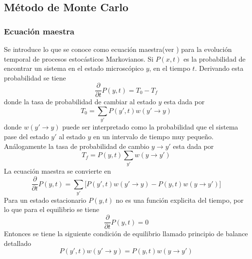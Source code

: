 \documentclass[a4paper]{article}
\begin{document}
\subsection{Método de Monte Carlo}
\subsubsection{Ecuación maestra}
Se introduce lo que se conoce como ecuación maestra(ver \cite{Salinas}) para la evolución temporal de procesos estocásticos Markovianos. Si $P(x,t)$ es la probabilidad de encontrar un sistema en el estado microscópico $y$, en el tiempo $t$. Derivando esta probabilidad se tiene
\begin{equation}
\frac{\partial}{\partial t}P(y,t)=T_0-T_f
\end{equation}
donde la tasa de probabilidad de cambiar al estado $y$ esta dada por
\begin{equation}
T_0=\sum_{y'}P(y',t)w(y'\rightarrow y)
\end{equation}
donde $w(y'\rightarrow y)$ puede ser interpretado como la probabilidad que el sistema pase del estado $y'$ al estado $y$ en un intervalo de tiempo muy pequeño. Análogamente la tasa de probabilidad de cambio $y\rightarrow y'$ esta dada por
\begin{equation}
T_f=P(y,t)\sum_{y'}w(y\rightarrow y')
\end{equation}
La ecuación maestra se convierte en 
\begin{equation}\label{masterEq}
\frac{\partial}{\partial t}P(y,t)=\sum_{y'}\Big[P(y',t)w(y'\rightarrow y)-P(y,t)w(y\rightarrow y')\Big]
\end{equation}
Para un estado estacionario $P(y,t)$ no es una función explicita del tiempo, por lo que para el equilibrio se tiene
\begin{equation}
\frac{\partial}{\partial t}P(y,t)=0
\end{equation}
Entonces se tiene la siguiente condición de equilibrio llamado principio de balance detallado
\begin{equation}\label{equi}
P(y',t)w(y'\rightarrow y)=P(y,t)w(y\rightarrow y')
\end{equation}
\end{document}
